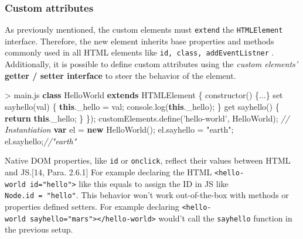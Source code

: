 \documentclass[]{article}
\newenvironment{Shaded}{}{}
\newcommand{\KeywordTok}[1]{\textcolor[rgb]{0.00,0.44,0.13}{\textbf{{#1}}}}
\newcommand{\StringTok}[1]{\textcolor[rgb]{0.25,0.44,0.63}{{#1}}}
\newcommand{\CommentTok}[1]{\textcolor[rgb]{0.38,0.63,0.69}{\textit{{#1}}}}
\newcommand{\VariableTok}[1]{\textcolor[rgb]{0.10,0.09,0.49}{{#1}}}
\newcommand{\ControlFlowTok}[1]{\textcolor[rgb]{0.00,0.44,0.13}{\textbf{{#1}}}}
\newcommand{\OperatorTok}[1]{\textcolor[rgb]{0.40,0.40,0.40}{{#1}}}
\newcommand{\AttributeTok}[1]{\textcolor[rgb]{0.49,0.56,0.16}{{#1}}}
\newcommand{\NormalTok}[1]{{#1}}
\begin{document}
\subsubsection{Custom attributes}\label{custom-attributes}

As previously mentioned, the custom elements must \texttt{extend} the
\texttt{HTMLElement} interface. Therefore, the new element inherits base
properties and methods commonly used in all HTML elements like
\texttt{id,\ class,\ addEventListner} . Additionally, it is possible to
define custom attributes using the \emph{custom elements'}
\textbf{getter / setter interface} to steer the behavior of the element.

\begin{Shaded}
\begin{Highlighting}[]
\OperatorTok{>} \VariableTok{main}\NormalTok{.}\AttributeTok{js}
\KeywordTok{class} \NormalTok{HelloWorld }\KeywordTok{extends} \NormalTok{HTMLElement }\OperatorTok{\{}
 \AttributeTok{constructor}\NormalTok{() }\OperatorTok{\{}\NormalTok{...}\OperatorTok{\}}
 \NormalTok{set }\AttributeTok{sayhello}\NormalTok{(val) }\OperatorTok{\{}
  \KeywordTok{this}\NormalTok{.}\AttributeTok{_hello} \OperatorTok{=} \NormalTok{val}\OperatorTok{;}
  \VariableTok{console}\NormalTok{.}\AttributeTok{log}\NormalTok{(}\KeywordTok{this}\NormalTok{.}\AttributeTok{_hello}\NormalTok{)}\OperatorTok{;}
 \OperatorTok{\}}
 \NormalTok{get }\AttributeTok{sayhello}\NormalTok{() }\OperatorTok{\{}
  \ControlFlowTok{return} \KeywordTok{this}\NormalTok{.}\AttributeTok{_hello}\OperatorTok{;}
 \OperatorTok{\}}
\OperatorTok{\}}\NormalTok{)}\OperatorTok{;}
\VariableTok{customElements}\NormalTok{.}\AttributeTok{define}\NormalTok{(}\StringTok{'hello-world'}\OperatorTok{,} \NormalTok{HelloWorld)}\OperatorTok{;}
\CommentTok{// Instantiation}
\KeywordTok{var} \NormalTok{el }\OperatorTok{=} \KeywordTok{new} \AttributeTok{HelloWorld}\NormalTok{()}\OperatorTok{;}
\VariableTok{el}\NormalTok{.}\AttributeTok{sayhello} \OperatorTok{=} \StringTok{"earth"}\OperatorTok{;}
\VariableTok{el}\NormalTok{.}\AttributeTok{sayhello}\OperatorTok{;}\CommentTok{//"earth"}
\end{Highlighting}
\end{Shaded}

Native DOM properties, like \texttt{id} or \texttt{onclick}, reflect
their values between HTML and JS.{[}14, Para. 2.6.1{]} For example
declaring the HTML
\texttt{\textless{}hello-world\ id="hello"\textgreater{}} like this
equals to assign the ID in JS like \texttt{Node.id\ =\ "hello"}. This
behavior won't work out-of-the-box with methods or properties defined
setters. For example declaring
\texttt{\textless{}hello-world\ sayhello="mars"\textgreater{}\textless{}/hello-world\textgreater{}}
would't call the \texttt{sayhello} function in the previous setup.
\end{document}
